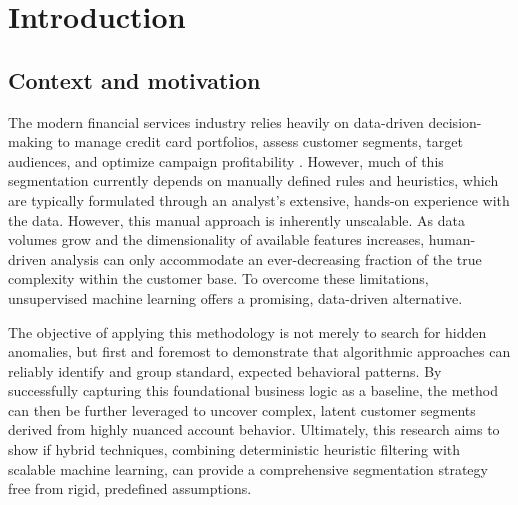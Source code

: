 




\chapter{Introduction}
    \section{Context and motivation}
    The modern financial services industry relies heavily on data-driven decision-making to manage credit card portfolios, assess customer segments, target audiences, and optimize campaign profitability \cite{sargeant_algorithmic_2023}.
    However, much of this segmentation currently depends on manually defined rules and heuristics, which are typically formulated through an analyst's extensive, hands-on experience with the data.
    However, this manual approach is inherently unscalable. As data volumes grow and the dimensionality of available features increases, human-driven analysis can only accommodate an ever-decreasing fraction of the true complexity within the customer base.
    To overcome these limitations, unsupervised machine learning offers a promising, data-driven alternative.
    
    The objective of applying this methodology is not merely to search for hidden anomalies, but first and foremost to demonstrate that algorithmic approaches can reliably identify and group standard, expected behavioral patterns.
    By successfully capturing this foundational business logic as a baseline, the method can then be further leveraged to uncover complex, latent customer segments derived from highly nuanced account behavior.
    Ultimately, this research aims to show if hybrid techniques, combining deterministic heuristic filtering with scalable machine learning, can provide a comprehensive segmentation strategy free from rigid, predefined assumptions.
    
